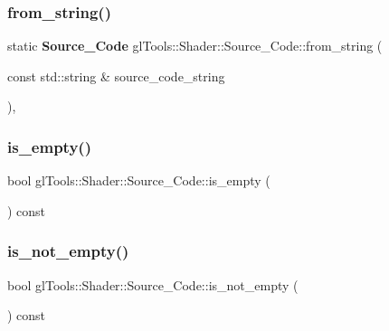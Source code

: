 \mbox{\label{classgl_tools_1_1_shader_1_1_source___code_a315251bdc1e2ced6842771dc6b9413e3}} 
\subsubsection{from\_string()}
{\footnotesize\ttfamily static \textbf{ Source\+\_\+\+Code} gl\+Tools\+::\+Shader\+::\+Source\+\_\+\+Code\+::from\+\_\+string (\begin{DoxyParamCaption}\item[{const std\+::string \&}]{source\+\_\+code\+\_\+string }\end{DoxyParamCaption})\hspace{0.3cm}{\ttfamily [inline]}, {\ttfamily [static]}}

\mbox{\label{classgl_tools_1_1_shader_1_1_source___code_acb291952620ad0823eabe8939536f123}} 
\subsubsection{is\_empty()}
{\footnotesize\ttfamily bool gl\+Tools\+::\+Shader\+::\+Source\+\_\+\+Code\+::is\+\_\+empty (\begin{DoxyParamCaption}{ }\end{DoxyParamCaption}) const\hspace{0.3cm}{\ttfamily [inline]}}

\mbox{\label{classgl_tools_1_1_shader_1_1_source___code_abc6c5dae70ca89082060bc6e220a5973}} 
\subsubsection{is\_not\_empty()}
{\footnotesize\ttfamily bool gl\+Tools\+::\+Shader\+::\+Source\+\_\+\+Code\+::is\+\_\+not\+\_\+empty (\begin{DoxyParamCaption}{ }\end{DoxyParamCaption}) const\hspace{0.3cm}{\ttfamily [inline]}}

